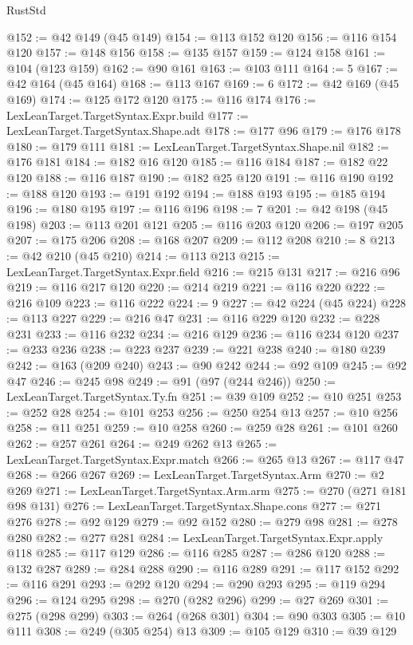 \begin{lexlean}{RustStd}
\begin{coremodule}
@152 := @42 @149 (@45 @149)
@154 := @113 @152 @120
@156 := @116 @154 @120
@157 := @148 @156
@158 := @135 @157
@159 := @124 @158
@161 := @104 (@123 @159)
@162 := @90 @161
@163 := @103 @111
@164 := 5
@167 := @42 @164 (@45 @164)
@168 := @113 @167
@169 := 6
@172 := @42 @169 (@45 @169)
@174 := @125 @172 @120
@175 := @116 @174
@176 := LexLeanTarget.TargetSyntax.Expr.build
@177 := LexLeanTarget.TargetSyntax.Shape.adt
@178 := @177 @96
@179 := @176 @178
@180 := @179 @111
@181 := LexLeanTarget.TargetSyntax.Shape.nil
@182 := @176 @181
@184 := @182 @16 @120
@185 := @116 @184
@187 := @182 @22 @120
@188 := @116 @187
@190 := @182 @25 @120
@191 := @116 @190
@192 := @188 @120
@193 := @191 @192
@194 := @188 @193
@195 := @185 @194
@196 := @180 @195
@197 := @116 @196
@198 := 7
@201 := @42 @198 (@45 @198)
@203 := @113 @201 @121
@205 := @116 @203 @120
@206 := @197 @205
@207 := @175 @206
@208 := @168 @207
@209 := @112 @208
@210 := 8
@213 := @42 @210 (@45 @210)
@214 := @113 @213
@215 := LexLeanTarget.TargetSyntax.Expr.field
@216 := @215 @131
@217 := @216 @96
@219 := @116 @217 @120
@220 := @214 @219
@221 := @116 @220
@222 := @216 @109
@223 := @116 @222
@224 := 9
@227 := @42 @224 (@45 @224)
@228 := @113 @227
@229 := @216 @47
@231 := @116 @229 @120
@232 := @228 @231
@233 := @116 @232
@234 := @216 @129
@236 := @116 @234 @120
@237 := @233 @236
@238 := @223 @237
@239 := @221 @238
@240 := @180 @239
@242 := @163 (@209 @240)
@243 := @90 @242
@244 := @92 @109
@245 := @92 @47
@246 := @245 @98
@249 := @91 (@97 (@244 @246))
@250 := LexLeanTarget.TargetSyntax.Ty.fn
@251 := @39 @109
@252 := @10 @251
@253 := @252 @28
@254 := @101 @253
@256 := @250 @254 @13
@257 := @10 @256
@258 := @11 @251
@259 := @10 @258
@260 := @259 @28
@261 := @101 @260
@262 := @257 @261
@264 := @249 @262 @13
@265 := LexLeanTarget.TargetSyntax.Expr.match
@266 := @265 @13
@267 := @117 @47
@268 := @266 @267
@269 := LexLeanTarget.TargetSyntax.Arm
@270 := @2 @269
@271 := LexLeanTarget.TargetSyntax.Arm.arm
@275 := @270 (@271 @181 @98 @131)
@276 := LexLeanTarget.TargetSyntax.Shape.cons
@277 := @271 @276
@278 := @92 @129
@279 := @92 @152
@280 := @279 @98
@281 := @278 @280
@282 := @277 @281
@284 := LexLeanTarget.TargetSyntax.Expr.apply @118
@285 := @117 @129
@286 := @116 @285
@287 := @286 @120
@288 := @132 @287
@289 := @284 @288
@290 := @116 @289
@291 := @117 @152
@292 := @116 @291
@293 := @292 @120
@294 := @290 @293
@295 := @119 @294
@296 := @124 @295
@298 := @270 (@282 @296)
@299 := @27 @269
@301 := @275 (@298 @299)
@303 := @264 (@268 @301)
@304 := @90 @303
@305 := @10 @111
@308 := @249 (@305 @254) @13
@309 := @105 @129
@310 := @39 @129

\end{coremodule}
\end{lexlean}
